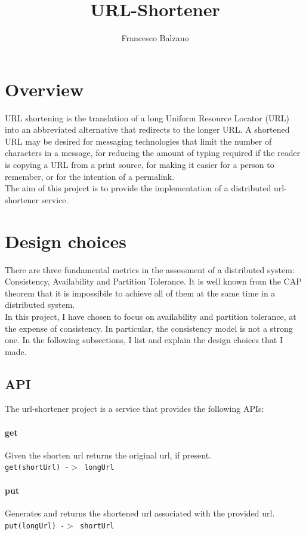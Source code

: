 \documentclass{article}
\title{URL-Shortener}
\author{Francesco Balzano}
\begin{document}
  \maketitle
  \newpage
  \tableofcontents
  \newpage
  
\section{Overview}  
URL shortening is the translation of a long Uniform Resource Locator (URL) into an abbreviated alternative that redirects to the longer URL.  A shortened URL may be desired for messaging technologies that limit the number of characters in a message, for reducing the amount of typing required if the reader is copying a URL from a print source, for making it easier for a person to remember, or for the intention of a permalink.\\  
The aim of this project is to provide the implementation of a distributed url-shortener service.


\section{Design choices}
There are three fundamental metrics in the assessment of a distributed system: Consistency, Availability and Partition Tolerance. It is well known from the CAP theorem that it is impossibile to achieve all of them at the same time in a distributed system. \\ 
In this project, I have chosen to focus on availability and partition tolerance, at the expense of consistency. In particular, the consistency model is not a strong one.
In the following subsections, I list and explain the design choices that I made.


\subsection{API}
The url-shortener project is a service that provides the following APIs:

\paragraph{get}
Given the shorten url returns the original url, if present. \\
\texttt{get(shortUrl) -$>$ longUrl}

\paragraph{put}
Generates and returns the shortened url associated with the provided url. \\
\texttt{put(longUrl) -$>$  shortUrl}
\end{document}
